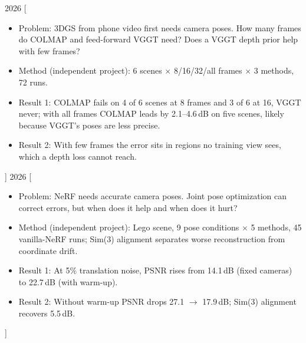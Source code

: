 \documentclass{resume}
\begin{document}
\begin{experiences}
  \experience%
    {2026}%
    { \hfill
     \enspace
     }%
    [\begin{itemize}
      \item Problem: 3DGS from phone video first needs camera poses. How many frames do COLMAP and feed-forward VGGT need? Does a VGGT depth prior help with few frames?
      \item Method (independent project): 6 scenes $\times$ 8/16/32/all frames $\times$ 3 methods, 72 runs.
      \item Result 1:  COLMAP fails on 4 of 6 scenes at 8 frames and 3 of 6 at 16, VGGT never;
        with all frames COLMAP leads by 2.1--4.6\,dB on five scenes, likely because VGGT's poses are less precise.
      \item Result 2:  With few frames the error sits in regions no training view sees, which a depth loss cannot reach.
    \end{itemize}]
  \separator{0.5ex}
  \experience%
    {2026}%
    { \hfill
     \enspace
     }%
    [\begin{itemize}
      \item Problem: NeRF needs accurate camera poses. Joint pose optimization can correct errors, but when does it help and when does it hurt?
      \item Method (independent project): Lego scene, 9 pose conditions $\times$ 5 methods, 45 vanilla-NeRF runs; Sim(3) alignment separates worse reconstruction from coordinate drift.
      \item Result 1:  At 5\% translation noise, PSNR rises from 14.1\,dB (fixed cameras) to 22.7\,dB (with warm-up).
      \item Result 2:  Without warm-up PSNR drops 27.1 $\rightarrow$ 17.9\,dB; Sim(3) alignment recovers 5.5\,dB.
    \end{itemize}]
  \separator{0.5ex}

\end{experiences}
\end{document}

